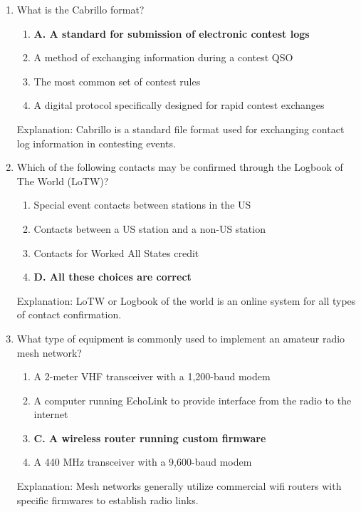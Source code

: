 \begin{enumerate}
     \item What is the Cabrillo format?
       \begin{enumerate}
    \item \textbf{A. A standard for submission of electronic contest logs}
      \item  A method of exchanging information during a contest QSO
    \item  The most common set of contest rules
    \item  A digital protocol specifically designed for rapid contest exchanges
       \end{enumerate}
          \textcolor{myred}{Explanation:}
          Cabrillo is a standard file format used for exchanging contact log information in contesting events.
         
      \item Which of the following contacts may be confirmed through the Logbook of The World (LoTW)?
          \begin{enumerate}
      \item  Special event contacts between stations in the US
        \item  Contacts between a US station and a non-US station
         \item  Contacts for Worked All States credit
       \item \textbf{D. All these choices are correct}
    \end{enumerate}
         \textcolor{myred}{Explanation:}
      LoTW or Logbook of the world is an online system for all types of contact confirmation.

    \item What type of equipment is commonly used to implement an amateur radio mesh network?
       \begin{enumerate}
        \item  A 2-meter VHF transceiver with a 1,200-baud modem
         \item  A computer running EchoLink to provide interface from the radio to the internet
      \item \textbf{C. A wireless router running custom firmware}
     \item  A 440 MHz transceiver with a 9,600-baud modem
    \end{enumerate}
        \textcolor{myred}{Explanation:}
    Mesh networks generally utilize commercial wifi routers with specific firmwares to establish radio links.
     

\end{enumerate}
